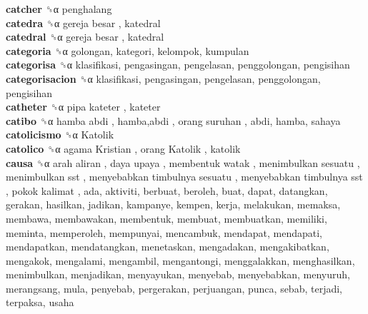 \textbf{catcher} ␝α  penghalang  \\
\textbf{catedra} ␝α   gereja besar , katedral  \\
\textbf{catedral} ␝α   gereja besar , katedral  \\
\textbf{categoria} ␝α  golongan, kategori, kelompok, kumpulan  \\
\textbf{categorisa} ␝α  klasifikasi, pengasingan, pengelasan, penggolongan, pengisihan  \\
\textbf{categorisacion} ␝α  klasifikasi, pengasingan, pengelasan, penggolongan, pengisihan  \\
\textbf{catheter} ␝α   pipa kateter , kateter  \\
\textbf{catibo} ␝α   hamba abdi ,  hamba,abdi ,  orang suruhan , abdi, hamba, sahaya  \\
\textbf{catolicismo} ␝α   Katolik   \\
\textbf{catolico} ␝α   agama Kristian ,  orang Katolik , katolik  \\
\textbf{causa} ␝α   arah aliran ,  daya upaya ,  membentuk watak ,  menimbulkan sesuatu ,  menimbulkan sst ,  menyebabkan timbulnya sesuatu ,  menyebabkan timbulnya sst ,  pokok kalimat , ada, aktiviti, berbuat, beroleh, buat, dapat, datangkan, gerakan, hasilkan, jadikan, kampanye, kempen, kerja, melakukan, memaksa, membawa, membawakan, membentuk, membuat, membuatkan, memiliki, meminta, memperoleh, mempunyai, mencambuk, mendapat, mendapati, mendapatkan, mendatangkan, menetaskan, mengadakan, mengakibatkan, mengakok, mengalami, mengambil, mengantongi, menggalakkan, menghasilkan, menimbulkan, menjadikan, menyayukan, menyebab, menyebabkan, menyuruh, merangsang, mula, penyebab, pergerakan, perjuangan, punca, sebab, terjadi, terpaksa, usaha  \\
